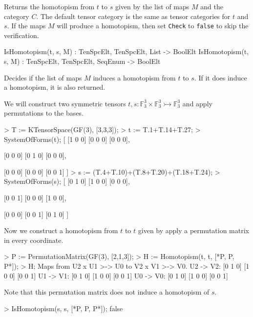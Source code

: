 Returns the homotopism from $t$ to $s$ given by the list of maps $M$ and the category $C$. 
The default tensor category is the same as tensor categories for $t$ and $s$.
If the maps $M$ will produce a homotopism, then set \texttt{Check} to \texttt{false} to skip the verification.

\begin{intrinsics}
IsHomotopism(t, s, M) : TenSpcElt, TenSpcElt, List -> BoolElt
IsHomotopism(t, s, M) : TenSpcElt, TenSpcElt, SeqEnum -> BoolElt
\end{intrinsics}

Decides if the list of maps $M$ induces a homotopism from $t$ to $s$. 
If it does induce a homotopism, it is also returned.

\begin{example}[HomotopismConst]

We will construct two symmetric tensors $t,s:\mathbb{F}_3^3\times\mathbb{F}_3^3\rightarrowtail\mathbb{F}_3^3$ and apply permutations to the bases.
\begin{code}
> T := KTensorSpace(GF(3), [3,3,3]);
> t := T.1+T.14+T.27;
> SystemOfForms(t);
[
    [1 0 0]
    [0 0 0]
    [0 0 0],

    [0 0 0]
    [0 1 0]
    [0 0 0],

    [0 0 0]
    [0 0 0]
    [0 0 1]
]
> s := (T.4+T.10)+(T.8+T.20)+(T.18+T.24);
> SystemOfForms(s);
[
    [0 1 0]
    [1 0 0]
    [0 0 0],

    [0 0 1]
    [0 0 0]
    [1 0 0],

    [0 0 0]
    [0 0 1]
    [0 1 0]
]
\end{code}

Now we construct a homotopism from $t$ to $t$ given by apply a permutation matrix in every coordinate.
\begin{code}
> P := PermutationMatrix(GF(3), [2,1,3]);
> H := Homotopism(t, t, [*P, P, P*]);
> H;
Maps from U2 x U1 >-> U0 to V2 x V1 >-> V0.
U2 -> V2: 
[0 1 0]
[1 0 0]
[0 0 1]
U1 -> V1: 
[0 1 0]
[1 0 0]
[0 0 1]
U0 -> V0: 
[0 1 0]
[1 0 0]
[0 0 1]
\end{code}

Note that this permutation matrix does not induce a homotopism of $s$.
\begin{code}
> IsHomotopism(s, s, [*P, P, P*]);
false
\end{code}
\end{example}

